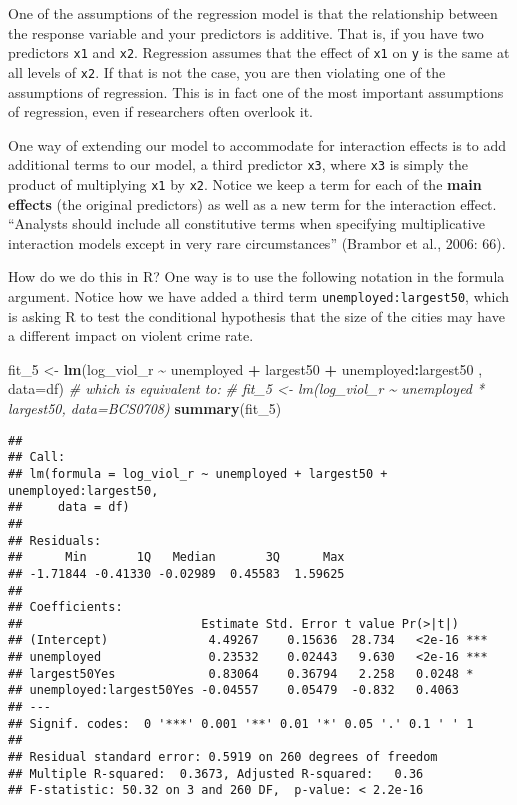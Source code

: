 \documentclass[
]{book}
\newenvironment{Shaded}{\begin{snugshade}}{\end{snugshade}}
\newcommand{\AttributeTok}[1]{\textcolor[rgb]{0.13,0.29,0.53}{#1}}
\newcommand{\CommentTok}[1]{\textcolor[rgb]{0.56,0.35,0.01}{\textit{#1}}}
\newcommand{\FunctionTok}[1]{\textcolor[rgb]{0.13,0.29,0.53}{\textbf{#1}}}
\newcommand{\NormalTok}[1]{#1}
\newcommand{\OtherTok}[1]{\textcolor[rgb]{0.56,0.35,0.01}{#1}}
\newcommand{\SpecialCharTok}[1]{\textcolor[rgb]{0.81,0.36,0.00}{\textbf{#1}}}
\begin{document}
One of the assumptions of the regression model is that the relationship between the response variable and your predictors is additive. That is, if you have two predictors \texttt{x1} and \texttt{x2}. Regression assumes that the effect of \texttt{x1} on \texttt{y} is the same at all levels of \texttt{x2}. If that is not the case, you are then violating one of the assumptions of regression. This is in fact one of the most important assumptions of regression, even if researchers often overlook it.

One way of extending our model to accommodate for interaction effects is to add additional terms to our model, a third predictor \texttt{x3}, where \texttt{x3} is simply the product of multiplying \texttt{x1} by \texttt{x2}. Notice we keep a term for each of the \textbf{main effects} (the original predictors) as well as a new term for the interaction effect. ``Analysts should include all constitutive terms when specifying multiplicative interaction models except in very rare circumstances'' (Brambor et al., 2006: 66).

How do we do this in R? One way is to use the following notation in the formula argument. Notice how we have added a third term \texttt{unemployed:largest50}, which is asking R to test the conditional hypothesis that the size of the cities may have a different impact on violent crime rate.

\begin{Shaded}
\begin{Highlighting}[]
\NormalTok{fit\_5 }\OtherTok{\textless{}{-}} \FunctionTok{lm}\NormalTok{(log\_viol\_r }\SpecialCharTok{\textasciitilde{}}\NormalTok{ unemployed }\SpecialCharTok{+}\NormalTok{ largest50 }\SpecialCharTok{+}\NormalTok{ unemployed}\SpecialCharTok{:}\NormalTok{largest50 , }\AttributeTok{data=}\NormalTok{df)}
\CommentTok{\# which is equivalent to: }
\CommentTok{\# fit\_5 \textless{}{-} lm(log\_viol\_r \textasciitilde{} unemployed * largest50, data=BCS0708)}
\FunctionTok{summary}\NormalTok{(fit\_5)}
\end{Highlighting}
\end{Shaded}

\begin{verbatim}
## 
## Call:
## lm(formula = log_viol_r ~ unemployed + largest50 + unemployed:largest50, 
##     data = df)
## 
## Residuals:
##      Min       1Q   Median       3Q      Max 
## -1.71844 -0.41330 -0.02989  0.45583  1.59625 
## 
## Coefficients:
##                         Estimate Std. Error t value Pr(>|t|)    
## (Intercept)              4.49267    0.15636  28.734   <2e-16 ***
## unemployed               0.23532    0.02443   9.630   <2e-16 ***
## largest50Yes             0.83064    0.36794   2.258   0.0248 *  
## unemployed:largest50Yes -0.04557    0.05479  -0.832   0.4063    
## ---
## Signif. codes:  0 '***' 0.001 '**' 0.01 '*' 0.05 '.' 0.1 ' ' 1
## 
## Residual standard error: 0.5919 on 260 degrees of freedom
## Multiple R-squared:  0.3673, Adjusted R-squared:   0.36 
## F-statistic: 50.32 on 3 and 260 DF,  p-value: < 2.2e-16
\end{verbatim}
\end{document}
